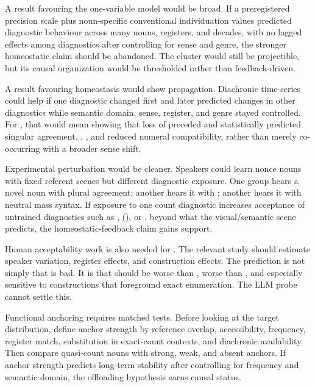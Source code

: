 \documentclass[12pt,a4paper]{article}
\begin{document}
A result favouring the one-variable model would be broad. If a preregistered precision scale plus noun-specific conventional individuation values predicted diagnostic behaviour across many nouns, registers, and decades, with no lagged effects among diagnostics after controlling for sense and genre, the stronger homeostatic claim should be abandoned. The cluster would still be projectible, but its causal organization would be thresholded rather than feedback-driven.

A result favouring homeostasis would show propagation. Diachronic time-series could help if one diagnostic changed first and later predicted changes in other diagnostics while semantic domain, sense, register, and genre stayed controlled. For , that would mean showing that loss of  preceded and statistically predicted singular agreement, , , and reduced numeral compatibility, rather than merely co-occurring with a broader sense shift.

Experimental perturbation would be cleaner. Speakers could learn nonce nouns with fixed referent scenes but different diagnostic exposure. One group hears a novel noun with plural agreement; another hears it with ; another hears it with neutral mass syntax. If exposure to one count diagnostic increases acceptance of untrained diagnostics such as , (), or , beyond what the visual/semantic scene predicts, the homeostatic-feedback claim gains support.

Human acceptability work is also needed for . The relevant study should estimate speaker variation, register effects, and construction effects. The prediction is not simply that  is bad. It is that  should be worse than , worse than , and especially sensitive to constructions that foreground exact enumeration. The LLM probe cannot settle this.

Functional anchoring requires matched tests. Before looking at the target distribution, define anchor strength by reference overlap, accessibility, frequency, register match, substitution in exact-count contexts, and diachronic availability. Then compare quasi-count nouns with strong, weak, and absent anchors. If anchor strength predicts long-term stability after controlling for frequency and semantic domain, the offloading hypothesis earns causal status.
\end{document}
